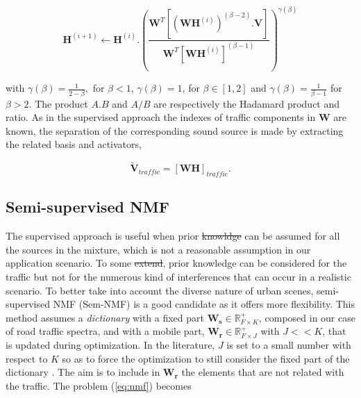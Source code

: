 \documentclass[twocolumn]{svjour3}          %
\providecommand{\DIFaddtex}[1]{{\protect\color{blue}\uwave{#1}}} %
\providecommand{\DIFdeltex}[1]{{\protect\color{red}\sout{#1}}}                      %
\providecommand{\DIFaddbegin}{} %
\providecommand{\DIFaddend}{} %
\providecommand{\DIFdelbegin}{} %
\providecommand{\DIFdelend}{} %
\providecommand{\DIFadd}[1]{\texorpdfstring{\DIFaddtex{#1}}{#1}} %
\providecommand{\DIFdel}[1]{\texorpdfstring{\DIFdeltex{#1}}{}} %
\begin{document}
\begin{equation}\label{eq:updateH_Sup}
\textbf{H}^{(i+1)} \leftarrow \textbf{H}^{(i)}.\left(\frac{\textbf{W}^T \left[\left(\textbf{WH}^{(i)} \right)^{(\beta-2)}.\textbf{V} \right]}{\textbf{W}^T \left[\textbf{WH}^{(i)} \right]^{(\beta-1)}}\right)^{\gamma(\beta)}
\end{equation}

with $\gamma(\beta) = \frac{1}{2-\beta},$ for $\beta < 1$, $ \gamma(\beta) = 1$, for $\beta \in \left[1,2\right]$ and $\gamma(\beta) = \frac{1}{\beta-1}$ for $\beta > 2$. The product $A.B$ and $A/B$ are respectively the Hadamard product and ratio. As in the supervised approach the indexes of traffic components in $\mathbf{W}$  are known, the separation of the corresponding sound source is made by extracting the related basis and activators,

\begin{equation}\label{eq:separationExtraction}
\mathbf{\tilde{V}}_{traffic} = \left[ \mathbf{WH} \right]_{traffic}.
\end{equation}

\subsection{Semi-supervised NMF}

The supervised approach is useful when prior \DIFdelbegin \DIFdel{knowldge }\DIFdelend \DIFaddbegin \DIFadd{knowledge }\DIFaddend can be assumed for all the sources in the mixture, which is not a reasonable assumption in our application scenario. To some \DIFdelbegin \DIFdel{extend}\DIFdelend \DIFaddbegin \DIFadd{extent}\DIFaddend , prior knowledge can be considered for the traffic but not for the numerous kind of interferences that can occur in a realistic scenario. To better take into account the diverse nature of urban scenes, semi-supervised NMF (Sem-NMF)\cite{lee_semi-supervised_2010} is a good candidate as it offers more flexibility. This method assumes a \textit{dictionary} with a fixed part $\mathbf{W_s} \in \mathbb{R}^+_{F\times K}$, composed in our case of road traffic spectra, and with a mobile part, $\mathbf{W_r} \in \mathbb{R}^+_{F\times J}$ with $J <<K$, that is updated during optimization. In the literature, $J$ is set to a small number with respect to $K$ so as to force the optimization to still consider the fixed part of the dictionary \cite{lefevre2012semi}. The aim is to include in $\mathbf{W_r}$ the elements that are not related with the traffic. The problem (\ref{eq:nmf}) becomes
\end{document}
